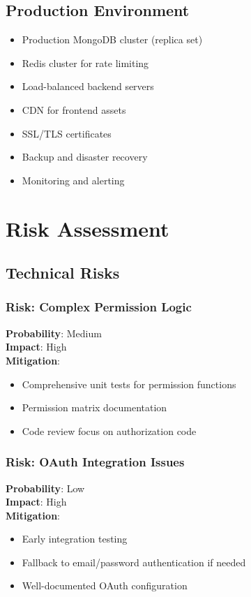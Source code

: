 \documentclass[12pt,a4paper]{article}
\begin{document}
\subsection{Production Environment}
\begin{itemize}
    \item Production MongoDB cluster (replica set)
    \item Redis cluster for rate limiting
    \item Load-balanced backend servers
    \item CDN for frontend assets
    \item SSL/TLS certificates
    \item Backup and disaster recovery
    \item Monitoring and alerting
\end{itemize}

\section{Risk Assessment}

\subsection{Technical Risks}

\subsubsection{Risk: Complex Permission Logic}
\textbf{Probability}: Medium\\
\textbf{Impact}: High\\
\textbf{Mitigation}:
\begin{itemize}
    \item Comprehensive unit tests for permission functions
    \item Permission matrix documentation
    \item Code review focus on authorization code
\end{itemize}

\subsubsection{Risk: OAuth Integration Issues}
\textbf{Probability}: Low\\
\textbf{Impact}: High\\
\textbf{Mitigation}:
\begin{itemize}
    \item Early integration testing
    \item Fallback to email/password authentication if needed
    \item Well-documented OAuth configuration
\end{itemize}
\end{document}

